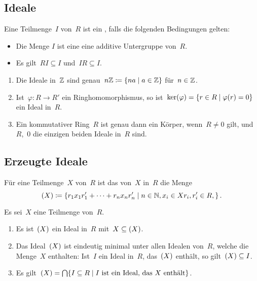 \subsection{Ideale}

\begin{definition}
  Eine Teilmenge~$I$ von~$R$ ist ein , falls die folgenden Bedingungen gelten:
  \begin{itemize}
    \item
      Die Menge $I$ ist eine eine additive Untergruppe von~$R$.
    \item
      Es gilt~$RI \subseteq I$ und~$IR \subseteq I$.
  \end{itemize}
\end{definition}

\begin{example}
  \leavevmode
  \begin{enumerate}
    \item
      Die Ideale in~$\mathbb{Z}$ sind genau~$n \Integer \defined \{ na \suchthat a \in \Integer \}$ für~$n \in \mathbb{Z}$.
    \item
      Ist~$\varphi \colon R \to R'$ ein Ringhomomorphismus, so ist~$\ker(\varphi) = \{ r \in R \suchthat \varphi(r) = 0 \}$ ein Ideal in~$R$.
    \item
      Ein kommutativer Ring~$R$ ist genau dann ein Körper, wenn~$R \neq 0$ gilt, und~$R$,~$0$ die einzigen beiden Ideale in~$R$ sind.
  \end{enumerate}
\end{example}



\subsection{Erzeugte Ideale}

\begin{definition}
  Für eine Teilmenge~$X$ von~$R$ ist das von~$X$ in~$R$  die Menge
  \[
    \genideal{X}
    \defined
    \{
      r_1 x_1 r'_1 + \dotsb + r_n x_n r'_n
    \suchthat
      n \in \Natural,
      x_i \in X
      r_i, r'_i \in R,
    \} \,.
  \]
\end{definition}

\begin{proposition}
  Es sei~$X$ eine Teilmenge von~$R$.
  \begin{enumerate}
    \item
      Es ist~$(X)$ ein Ideal in~$R$ mit~$X \subseteq (X)$.
    \item
      Das Ideal~$(X)$ ist eindeutig minimal unter allen Idealen von~$R$, welche die Menge~$X$ enthalten:
      Ist~$I$ ein Ideal in~$R$, das~$(X)$ enthält, so gilt~$(X) \subseteq I$.
    \item
      Es gilt~$\genideal{X} = \bigcap \{ I \subseteq R \suchthat \text{$I$ ist ein Ideal, das~$X$ enthält} \}$.
  \end{enumerate}
\end{proposition}



